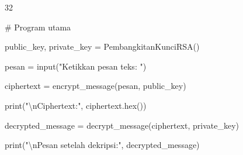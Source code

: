 \documentclass{article}
\begin{document}

32

\# Program utama

public\_key, private\_key = PembangkitanKunciRSA()

pesan = input("Ketikkan pesan teks: ")

ciphertext = encrypt\_message(pesan, public\_key)

print("\textbackslash{}nCiphertext:", ciphertext.hex())

decrypted\_message = decrypt\_message(ciphertext, private\_key)

print("\textbackslash{}nPesan setelah dekripsi:", decrypted\_message)
\end{document}
